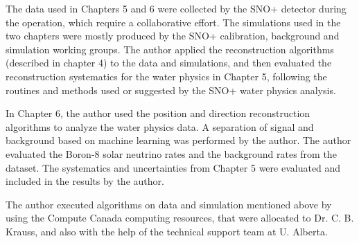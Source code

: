 The data used in Chapters 5 and 6 were collected by the SNO+ detector during the operation, which require a collaborative effort. The simulations used in the two chapters were mostly produced by the SNO+ calibration, background and simulation working groups. The author applied the reconstruction algorithms (described in chapter 4) to the data and simulations, and then evaluated the reconstruction systematics for the water physics in Chapter 5, following the routines and methods used or suggested by the SNO+ water physics analysis.

In Chapter 6, the author used the position and direction reconstruction algorithms to analyze the water physics data. A separation of signal and background based on machine learning was performed by the author. The author evaluated the Boron-8 solar neutrino rates and the background rates from the dataset. The systematics and uncertainties from Chapter 5 were evaluated and included in the results by the author.

The author executed algorithms on data and simulation mentioned above by using the Compute Canada computing resources, that were allocated to Dr. C. B. Krauss, and also with the help of the technical support team at U. Alberta.
